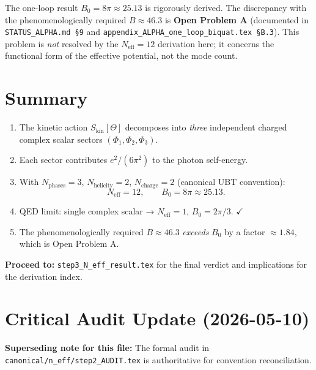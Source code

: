 \documentclass[12pt,a4paper]{article}
\theoremstyle{definition}
\theoremstyle{remark}
\newcommand{\Neff}{N_{\mathrm{eff}}}
\begin{document}
The one-loop result $B_0 = 8\pi \approx 25.13$ is rigorously derived.
The discrepancy with the phenomenologically required $B \approx 46.3$ is
\textbf{Open Problem A} (documented in \texttt{STATUS\_ALPHA.md §9} and
\texttt{appendix\_ALPHA\_one\_loop\_biquat.tex §B.3}).  This problem is
\emph{not} resolved by the $\Neff = 12$ derivation here; it concerns the
functional form of the effective potential, not the mode count.

\section{Summary}
\label{sec:summary}

\begin{enumerate}
  \item The kinetic action $S_\mathrm{kin}[\Theta]$ decomposes into
    \emph{three} independent charged complex scalar sectors
    $(\Phi_1, \Phi_2, \Phi_3)$.
  \item Each sector contributes $e^2/(6\pi^2)$ to the photon self-energy.
  \item With $N_\mathrm{phases} = 3$, $N_\mathrm{helicity} = 2$,
    $N_\mathrm{charge} = 2$ (canonical UBT convention):
    \begin{equation}
      \Neff = 12, \qquad B_0 = 8\pi \approx 25.13.
    \end{equation}
  \item QED limit: single complex scalar → $\Neff = 1$, $B_0 = 2\pi/3$. $\checkmark$
  \item The phenomenologically required $B \approx 46.3$ \emph{exceeds} $B_0$
    by a factor $\approx 1.84$, which is Open Problem A.
\end{enumerate}

\noindent\textbf{Proceed to:}
\texttt{step3\_N\_eff\_result.tex} for the final verdict
and implications for the derivation index.


\section{Critical Audit Update (2026-05-10)}
\label{sec:audit_update_20260510}

\textbf{Superseding note for this file:}
The formal audit in \texttt{canonical/n\_eff/step2\_AUDIT.tex} is authoritative
for convention reconciliation.
\end{document}
